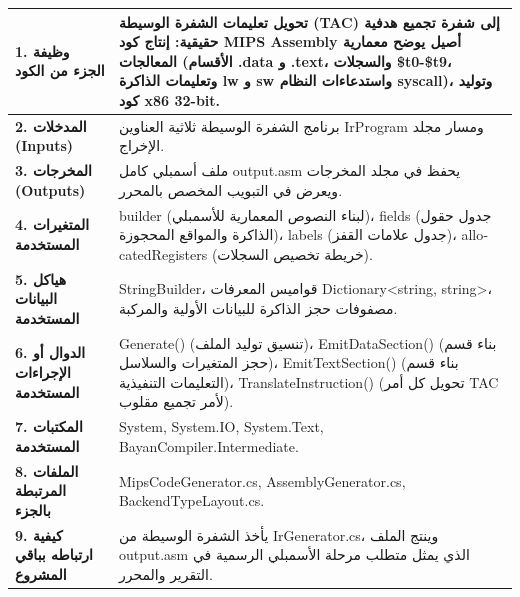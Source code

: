 \documentclass[12pt,a4paper]{report}
\begin{document}
\begin{tcolorbox}[colback=white,colframe=vscodeBlue!80!black,arc=2mm,title=\textbf{بطاقة المواصفات البرمجية لتوليد كود التجميع (Target Assembly Generator Specification)}]
\begin{tabularx}{\linewidth}{p{4.2cm} X}
    \textbf{1. وظيفة الجزء من الكود} & تحويل تعليمات الشفرة الوسيطة (TAC) إلى شفرة تجميع هدفية حقيقية: إنتاج كود MIPS Assembly أصيل يوضح معمارية المعالجات (الأقسام \textenglish{.data} و \textenglish{.text}، والسجلات \textenglish{\$t0-\$t9}، وتعليمات الذاكرة \textenglish{lw} و \textenglish{sw} واستدعاءات النظام \textenglish{syscall})، وتوليد كود x86 32-bit. \\
    \midrule
    \textbf{2. المدخلات (Inputs)} & برنامج الشفرة الوسيطة ثلاثية العناوين \textenglish{IrProgram} ومسار مجلد الإخراج. \\
    \midrule
    \textbf{3. المخرجات (Outputs)} & ملف أسمبلي كامل \textenglish{output.asm} يحفظ في مجلد المخرجات ويعرض في التبويب المخصص بالمحرر. \\
    \midrule
    \textbf{4. المتغيرات المستخدمة} & \textenglish{builder} (لبناء النصوص المعمارية للأسمبلي)، \textenglish{fields} (جدول حقول الذاكرة والمواقع المحجوزة)، \textenglish{labels} (جدول علامات القفز)، \textenglish{allocatedRegisters} (خريطة تخصيص السجلات). \\
    \midrule
    \textbf{5. هياكل البيانات المستخدمة} & \textenglish{StringBuilder}، قواميس المعرفات \textenglish{Dictionary\textless string, string\textgreater}، مصفوفات حجز الذاكرة للبيانات الأولية والمركبة. \\
    \midrule
    \textbf{6. الدوال أو الإجراءات المستخدمة} & \textenglish{Generate()} (تنسيق توليد الملف)، \textenglish{EmitDataSection()} (بناء قسم حجز المتغيرات والسلاسل)، \textenglish{EmitTextSection()} (بناء قسم التعليمات التنفيذية)، \textenglish{TranslateInstruction()} (تحويل كل أمر TAC لأمر تجميع مقلوب). \\
    \midrule
    \textbf{7. المكتبات المستخدمة} & \textenglish{System, System.IO, System.Text, BayanCompiler.Intermediate}. \\
    \midrule
    \textbf{8. الملفات المرتبطة بالجزء} & \textenglish{MipsCodeGenerator.cs, AssemblyGenerator.cs, BackendTypeLayout.cs}. \\
    \midrule
    \textbf{9. كيفية ارتباطه بباقي المشروع} & يأخذ الشفرة الوسيطة من \textenglish{IrGenerator.cs}، وينتج الملف \textenglish{output.asm} الذي يمثل متطلب مرحلة الأسمبلي الرسمية في التقرير والمحرر. \\
\end{tabularx}
\end{tcolorbox}
\end{document}
